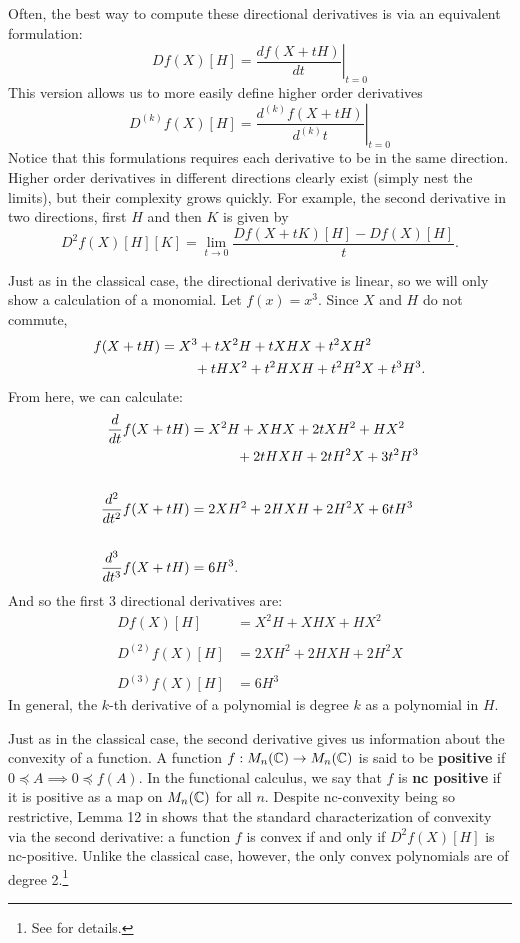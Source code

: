 Often, the best way to compute these directional derivatives is via an
equivalent formulation:
\[
    Df(X)[H] = \left.\frac{df(X+tH)}{dt}\right|_{t=0}
\]
This version allows us to more easily define higher order derivatives
\[
    D^{(k)}f(X)[H] = \left.\frac{d^{(k)}f(X+tH)}{d^{(k)}t}\right|_{t=0}
\]
Notice that this formulations requires each derivative to be in the same
direction. Higher order derivatives in different directions clearly exist
(simply nest the limits), but their complexity grows quickly. For example, the
second derivative in two directions, first \(H\) and then \(K\) is given by
\[
  D^2f(X)[H][K] = \lim_{t \to 0} \frac{Df(X+tK)[H] - Df(X)[H]}{t}.
\]

\begin{example}
  Just as in the classical case, the directional derivative is linear, so we
  will only show a calculation of a monomial. Let \(f(x)=x^3\). Since \(X\) and
  \(H\) do not commute,
  \begin{align*}
    f(X+tH) &= X^3+ tX^2H +tXHX + t^2XH^2\\
    & \hphantom{= X^3}+ tHX^2 + t^2HXH + t^2H^2X +t^3H^3.
  \end{align*}
  From here, we can calculate:
  \begin{align*}
    \frac{d}{dt} f(X+tH) &= X^2H + XHX + 2tXH^2 +HX^2\\
                  &\hphantom{=X^2H} +2tHXH +2tH^2X + 3t^2H^3 \\
     \\
    \frac{d^2}{dt^2} f(X+tH) &= 2XH^2+2HXH +2H^2X + 6tH^3 \\
     \\
    \frac{d^3}{dt^3} f(X+tH) &= 6H^3.
  \end{align*}
  And so the first 3 directional derivatives are:
  \begin{align*}
    Df(X)[H] &= X^2H + XHX +HX^2\\
    \\
    D^{(2)}f(X)[H] &= 2XH^2+2HXH +2H^2X \\
    \\
    D^{(3)}f(X)[H] &= 6H^3
  \end{align*}
  In general, the \(k\)-th derivative of a polynomial is degree \(k\) as a
  polynomial in \(H\).
\end{example}

Just as in the classical case, the second derivative gives us information
about the convexity of a function. A function \(f:M_n(\mathbb{C})\to M_n(\mathbb{C})\) is said
to be \textbf{positive} if \(0\preceq A \implies 0\preceq f(A)\). In the
functional calculus, we say that \(f\) is \textbf{nc positive} if it is positive
as a map on \(M_n(\mathbb{C})\) for all \(n\).
Despite nc-convexity being so restrictive, Lemma 12 in \cite{heltonFree2013}
shows that the standard characterization of convexity via the second
derivative: a function \(f\) is convex if and only if \(D^{2}f(X)[H]\) is
nc-positive. Unlike the classical case, however, the only convex polynomials are
of degree 2.\footnote{See \cite{heltonFree2013} for details.}

